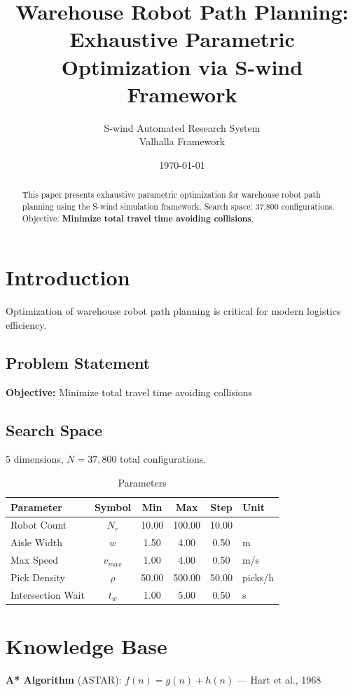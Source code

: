 \documentclass[11pt,twocolumn]{article}
\title{Warehouse Robot Path Planning: \\Exhaustive Parametric Optimization via S-wind Framework}
\author{S-wind Automated Research System\\Valhalla Framework}
\date{\today}
\begin{document}
\maketitle

\begin{abstract}
This paper presents exhaustive parametric optimization for warehouse robot path planning using the S-wind simulation framework.
Search space: 37,800 configurations. Objective: \textbf{Minimize total travel time avoiding collisions}.
\end{abstract}

\section{Introduction}
Optimization of warehouse robot path planning is critical for modern logistics efficiency.

\subsection{Problem Statement}
\textbf{Objective:} Minimize total travel time avoiding collisions

\subsection{Search Space}
5 dimensions, $N = 37,800$ total configurations.

\begin{table}[h]
\centering
\caption{Parameters}
\begin{tabular}{@{}lccccl@{}}
\toprule
Parameter & Symbol & Min & Max & Step & Unit \\
\midrule
Robot Count & $N_r$ & 10.00 & 100.00 & 10.00 &  \\
Aisle Width & $w$ & 1.50 & 4.00 & 0.50 & m \\
Max Speed & $v_{max}$ & 1.00 & 4.00 & 0.50 & m/s \\
Pick Density & $\rho$ & 50.00 & 500.00 & 50.00 & picks/h \\
Intersection Wait & $t_w$ & 1.00 & 5.00 & 0.50 & s \\
\bottomrule
\end{tabular}
\end{table}

\section{Knowledge Base}
\textbf{A* Algorithm} (ASTAR): $f(n) = g(n) + h(n)$ --- Hart et al., 1968
\end{document}
